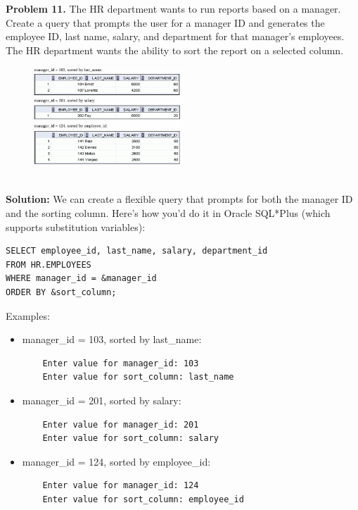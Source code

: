 \documentclass[12pt,a4paper]{article}
\begin{document}
\vspace{0.5cm}

\\ \\

\textbf{Problem 11.} The HR department wants to run reports based on a manager. Create a query that prompts the user for a manager ID and generates the employee ID, last name, salary, and department for that manager's employees. The HR department wants the ability to sort the report on a selected column.
\begin{figure}[htbp]
  \centering
  \includegraphics[width=0.5\textwidth]{Screenshots/211.png}
\end{figure}\\
\textbf{Solution:} We can create a flexible query that prompts for both the manager ID and the sorting column. Here's how you'd do it in Oracle SQL*Plus (which supports substitution variables):

\begin{lstlisting}[style=sqlstyle]
SELECT employee_id, last_name, salary, department_id
FROM HR.EMPLOYEES
WHERE manager_id = &manager_id
ORDER BY &sort_column;
\end{lstlisting}

Examples:
\begin{itemize}
    \item manager\_id = 103, sorted by last\_name:
    \begin{verbatim}
    Enter value for manager_id: 103
    Enter value for sort_column: last_name
    \end{verbatim}
    
    \item manager\_id = 201, sorted by salary:
    \begin{verbatim}
    Enter value for manager_id: 201
    Enter value for sort_column: salary
    \end{verbatim}
    
    \item manager\_id = 124, sorted by employee\_id:
    \begin{verbatim}
    Enter value for manager_id: 124
    Enter value for sort_column: employee_id
    \end{verbatim}
\end{itemize}
\end{document}
